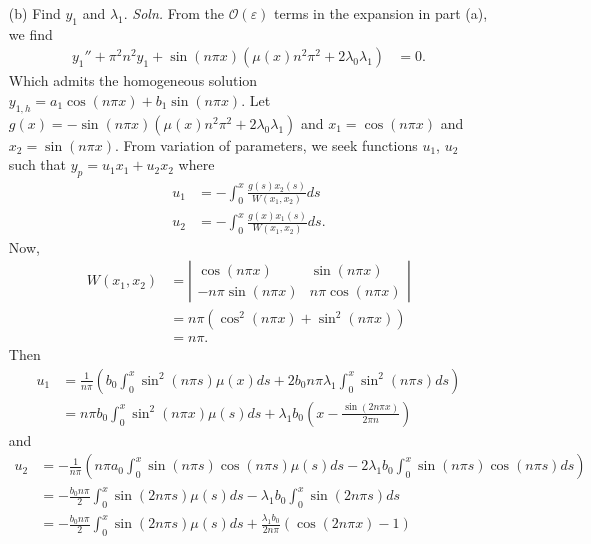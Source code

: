 \documentclass{article}
\begin{document}
\begin{itemize}
\begin{itemize}
        \item[(b)] Find $y_1$ and $\lambda_1$.
        \newline\newline
        \textit{Soln.} From the $\mathcal{O}(\varepsilon)$ terms in the expansion in part (a), we find
        \begin{align*}
            y_1'' + \pi^2n^2y_1 + \sin(n\pi x)(\mu(x)n^2\pi^2 + 2\lambda_0\lambda_1) &= 0.
        \end{align*}
        Which admits the homogeneous solution $y_{1,h} = a_1\cos(n\pi x) + b_1\sin(n\pi x)$. Let $g(x) = -\sin(n\pi x)(\mu(x)n^2\pi^2 + 2\lambda_0\lambda_1)$ and $x_1 = \cos(n\pi x)$ and $x_2 = \sin(n\pi x)$. From variation of parameters, we seek functions $u_1$, $u_2$ such that $y_p = u_1x_1 + u_2x_2$ where 
        \begin{align*}
            u_1 &= -\int_0^x\frac{g(s)x_2(s)}{W(x_1,x_2)}ds\\
            u_2 &= -\int_0^x\frac{g(x)x_1(s)}{W(x_1,x_2)}ds.
        \end{align*}
        Now, 
        \begin{align*}
            W(x_1,x_2) &= \left|\begin{matrix}
                \cos(n\pi x) & \sin(n\pi x)\\
                -n\pi \sin(n\pi x) & n\pi \cos(n\pi x)
            \end{matrix}\right|\\
            &= n\pi(\cos^2(n\pi x) + \sin^2(n\pi x))\\
            &= n\pi.
        \end{align*}
        Then
        \begin{align*}
            u_1 &= \frac{1}{n\pi}\left(b_0\int_0^x\sin^2(n\pi s)\mu(x)ds + 2b_0n\pi\lambda_1\int_0^x\sin^2(n\pi s)ds\right)\\
            &= n\pi b_0\int_0^x\sin^2(n\pi x)\mu(s)ds + \lambda_1b_0\left(x - \frac{\sin(2n\pi x)}{2\pi n}\right)
        \end{align*}
        and
        \begin{align*}
            u_2 &= -\frac{1}{n\pi}\left(n\pi a_0 \int_0^x\sin(n\pi s)\cos(n\pi s)\mu(s)ds - 2\lambda_1b_0\int_0^x\sin(n\pi s)\cos(n \pi s)ds\right)\\
            &= -\frac{b_0n\pi}{2}\int_0^x\sin(2n\pi s)\mu(s)ds - \lambda_1b_0\int_0^x\sin(2n\pi s)ds\\
            &= -\frac{b_0n\pi}{2}\int_0^x\sin(2n\pi s)\mu(s)ds + \frac{\lambda_1b_0}{2n\pi}(\cos(2n\pi x) - 1)

\end{align*}
\end{itemize}
\end{itemize}
\end{document}
